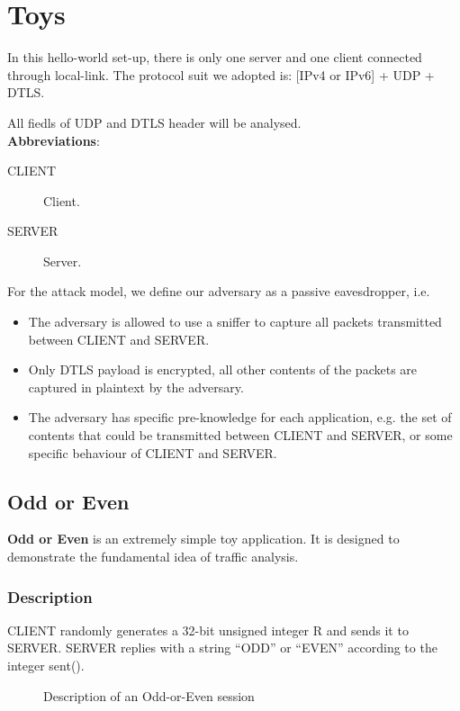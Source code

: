 \chapter{Toys}
\label{Chp: Toys}

In this hello-world set-up, there is only one server and one client connected through local-link. The protocol suit we adopted is: [IPv4 or IPv6] + UDP + DTLS.  

All fiedls of UDP and DTLS header will be analysed.
\\
\textbf{Abbreviations}:
\begin{description}
\item[CLIENT] Client.
\item[SERVER] Server.
\end{description}

For the attack model, we define our adversary as a passive eavesdropper, i.e.
\begin{itemize}
\item The adversary is allowed to use a sniffer to capture all packets transmitted between CLIENT and SERVER.
\item Only DTLS payload is encrypted, all other contents of the packets are captured in plaintext by the adversary.
\item The adversary has specific pre-knowledge for each application, e.g. the set of contents that could be transmitted between CLIENT and SERVER, or some specific behaviour of CLIENT and SERVER.
\end{itemize}

\section{Odd or Even}
\textbf{Odd or Even} is an extremely simple toy application. It is designed to demonstrate the fundamental idea of traffic analysis.

\subsection{Description}
CLIENT randomly generates a 32-bit unsigned integer R and sends it to SERVER. SERVER replies with a string “ODD'' or “EVEN” according to the integer sent().

\begin{figure}[H] 
\centering
\resizebox{8cm}{!}
{}
\caption{Description of an Odd-or-Even session}
\label{Fig: Odd or Even}
\end{figure}

